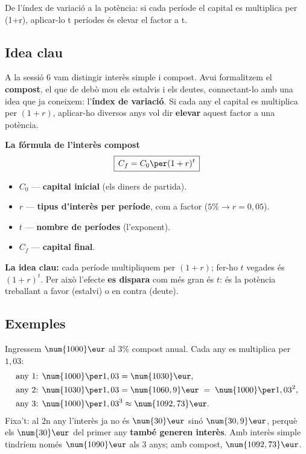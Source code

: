 %
{De l'índex de variació a la potència: si cada període el capital es multiplica per (1+r), aplicar-lo t períodes és elevar el factor a t.}

\subsection{Idea clau}

A la sessió 6 vam distingir interès simple i compost. Avui formalitzem el
\textbf{compost}, el que de debò mou els estalvis i els deutes, connectant-lo amb una
idea que ja coneixem: l'\textbf{índex de variació}. Si cada any el capital es
multiplica per $(1+r)$, aplicar-ho diversos anys vol dir \textbf{elevar} aquest factor
a una potència.

\begin{idea}
\textbf{La fórmula de l'interès compost}
\[
\boxed{\,C_f = C_0\per (1+r)^{t}\,}
\]
\begin{itemize}[leftmargin=1.4em, itemsep=2pt]
  \item $C_0$ — \textbf{capital inicial} (els diners de partida).
  \item $r$ — \textbf{tipus d'interès per període}, com a factor ($5\%\rightarrow r=0,05$).
  \item $t$ — \textbf{nombre de períodes} (l'exponent).
  \item $C_f$ — \textbf{capital final}.
\end{itemize}
\textbf{La idea clau:} cada període multipliquem per $(1+r)$; fer-ho $t$ vegades és
$(1+r)^t$. Per això l'efecte \textbf{es dispara} com més gran és $t$: és la potència
treballant a favor (estalvi) o en contra (deute).
\end{idea}

\subsection{Exemples}

\begin{exemple}
Ingressem $\num{1000}\eur$ al $3\%$ compost anual. Cada any es multiplica per $1,03$:
\[
\begin{aligned}
\text{any 1: } &\num{1000}\per 1,03=\num{1030}\eur,\\
\text{any 2: } &\num{1030}\per 1,03=\num{1060,9}\eur \;=\;\num{1000}\per 1,03^2,\\
\text{any 3: } &\num{1000}\per 1,03^3\approx\num{1092,73}\eur.
\end{aligned}
\]
Fixa't: al $2$n any l'interès ja no és $\num{30}\eur$ sinó $\num{30,9}\eur$, perquè
els $\num{30}\eur$ del primer any \textbf{també generen interès}. Amb interès simple
tindríem només $\num{1090}\eur$ als $3$ anys; amb compost, $\num{1092,73}\eur$.
\end{exemple}

